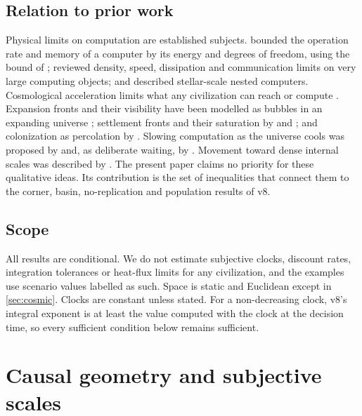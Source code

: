 \documentclass[11pt,a4paper]{article}
\theoremstyle{definition}
\begin{document}
\subsection{Relation to prior work}
Physical limits on computation are established subjects. 
bounded the operation rate and memory of a computer by its energy and degrees
of freedom, using the bound of \citet{MargolusLevitin1998}; \citet{Sandberg1999}
reviewed density, speed, dissipation and communication limits on very large
computing objects; and \citet{Bradbury1999} described stellar-scale nested
computers. Cosmological acceleration limits what any civilization can reach or
compute \citep{KraussStarkman2000,ArmstrongSandberg2013,Ord2021}. Expansion
fronts and their visibility have been modelled as bubbles in an expanding
universe \citep{Olson2015,Hanson2021Grabby}; settlement fronts and their
saturation by \citet{NewmanSagan1981} and \citet{CarrollNellenback2019}; and
colonization as percolation by \citet{Landis1998}. Slowing computation as the
universe cools was proposed by \citet{Dyson1979} and, as deliberate waiting, by
\citet{Sandberg2017}. Movement toward dense internal scales was described by
\citet{Smart2012}. The present paper claims no priority for these qualitative
ideas. Its contribution is the set of inequalities that connect them to the
corner, basin, no-replication and population results of v8.

\subsection{Scope}
All results are conditional. We do not estimate subjective clocks, discount
rates, integration tolerances or heat-flux limits for any civilization, and
the examples use scenario values labelled as such. Space is static and
Euclidean except in \cref{sec:cosmic}. Clocks are constant unless stated. For
a non-decreasing clock, v8's integral exponent is at least the value computed
with the clock at the decision time, so every sufficient condition below
remains sufficient.

\section{Causal geometry and subjective scales}
\label{sec:geometry}
\end{document}
